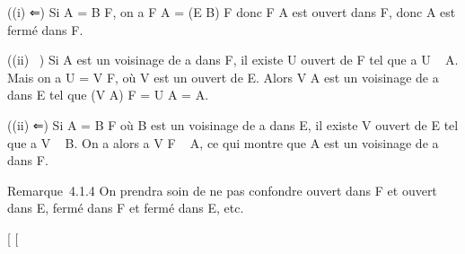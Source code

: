 \documentclass[]{article}
\begin{document}
((i) ⇐) Si A = B \bigcap F, on a F \diagdown A = (E \diagdown B) \bigcap F donc F \diagdown A est ouvert
dans F, donc A est fermé dans F.

((ii) \rigtharrow~) Si A est un voisinage de a dans F, il existe U ouvert de F tel
que a \in U \subset~ A. Mais on a U = V \bigcap F, où V est un ouvert de E. Alors V \cup A
est un voisinage de a dans E tel que (V \cup A) \bigcap F = U \cup A = A.

((ii) ⇐) Si A = B \bigcap F où B est un voisinage de a dans E, il existe V
ouvert de E tel que a \in V \subset~ B. On a alors a \in V \bigcap F \subset~ A, ce qui montre
que A est un voisinage de a dans F.

Remarque~4.1.4 On prendra soin de ne pas confondre ouvert dans F et
ouvert dans E, fermé dans F et fermé dans E, etc.

[
[
\end{document}
